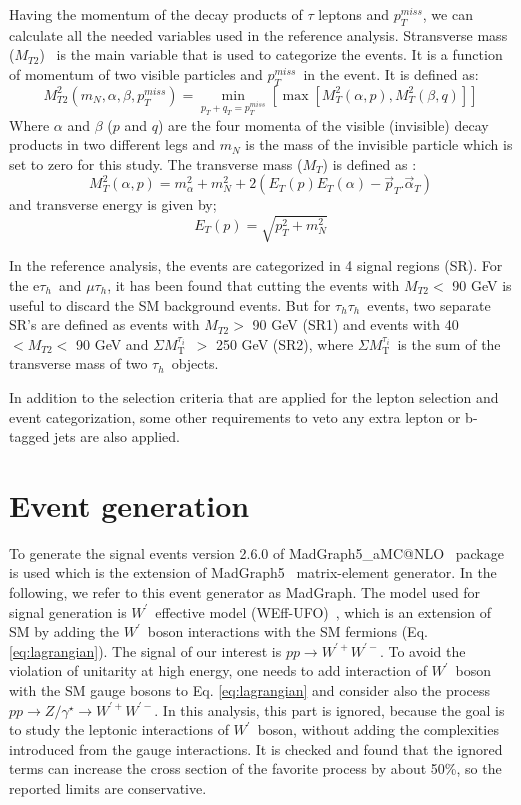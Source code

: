\documentclass[preprint,showpacs,preprintnumbers]{revtex4}
\newcommand{\wprime}{\ensuremath{W^\prime}~}
\newcommand{\wprimep}{\ensuremath{W^{\prime+}}}
\newcommand{\wprimem}{\ensuremath{W^{\prime-}}}
\newcommand{\Tau}{\ensuremath{\tau_h}}
\newcommand{\tauTau}{\ensuremath{\tau_h\tau_h}}
\newcommand{\mttwo}{\ensuremath{M_{T2}}}
\newcommand{\MET}{\ensuremath{p_T^{miss}}}
\newcommand{\SumMT}{ \ensuremath{\Sigma M_\mathrm{T}^{\tau_i}}~}
\begin{document}
Having the momentum of the decay products of $\tau$ leptons and \MET, we can calculate all the needed variables used in the reference analysis. Stransverse mass ($M_{T2}$)~\cite{Lester:1999tx,Barr:2003rg}  is the main variable that is used to categorize the events. It is a function of momentum of two visible particles and \MET ~in the event. It is defined as:
\begin{equation}
M^2_{T2}(m_{N},\alpha,\beta,\MET) = \displaystyle\min_{p_T+q_T=\MET} [\max[M^2_{T}(\alpha,p),M^2_{T}(\beta,q)]]
\end{equation}
Where $\alpha$ and $\beta$ ($p$ and $q$) are the four momenta of the visible (invisible) decay products in two different legs and  $m_N$ is the mass of the invisible particle which is set to zero for this study. The transverse mass ($M_{T}$) is defined as :
\begin{equation}
M^2_{T}(\alpha,p) =  m^2_{\alpha}+m^2_N+2(E_T(p)E_T(\alpha)-\vec{p}_T.\vec{\alpha}_T)
\end{equation}
and transverse energy is given by; 
\begin{equation}
E_T(p)=\sqrt{p^2_T+m^2_N}
\end{equation}

In the reference analysis, the events are categorized in 4 signal regions (SR). For the e\Tau ~and $\mu\Tau$, it has been found that cutting the events with $\mttwo <$ 90 GeV is useful to discard the SM background events. But for \tauTau ~events, two separate SR's are defined as events with $\mttwo>$ 90 GeV (SR1) and events with 40 $<\mttwo<$ 90 GeV  and \SumMT $>$ 250 GeV (SR2), where \SumMT is the sum of the transverse mass of two \Tau ~objects.

In addition to the selection criteria that are applied for the lepton selection and event categorization, some other requirements to veto any extra lepton or b-tagged jets  are also applied. 

\section{Event generation}\label{sec:simulation}
To generate the signal events version 2.6.0 of   MadGraph5\_aMC@NLO~\cite{Alwall:2014hca} package is used which is the extension of MadGraph5~\cite{Alwall:2011uj} matrix-element generator. In the following, we refer to this event generator  as MadGraph.
The model used for signal generation is \wprime effective model (WEff-UFO)~\cite{Sullivan:2002jt}, which  is an extension of SM by adding the \wprime boson interactions with the SM fermions (Eq. \ref{eq:lagrangian}). The signal of our interest is $ pp\rightarrow \wprimep \wprimem$. 
To avoid the violation of unitarity at high energy, one needs to add interaction of \wprime boson with the SM gauge bosons to Eq. \ref{eq:lagrangian} and consider also the process $pp\rightarrow Z/\gamma^{\star} \rightarrow \wprimep \wprimem$. In this analysis, this part is ignored, because the goal is to study the leptonic interactions of \wprime boson, without adding the complexities introduced from the gauge interactions. It is checked and found that the ignored terms can increase the cross section of the favorite process by about 50\%, so the reported limits are conservative.
\end{document}
